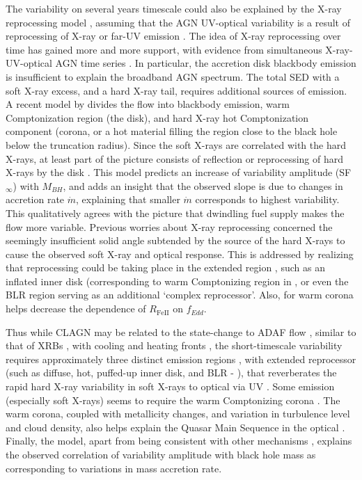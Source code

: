 \documentclass[twocolumn]{aastex62}
\begin{document}
The variability on several years timescale could also be explained by the X-ray reprocessing model \citep{kokubo2015, kubota2018}, assuming that the AGN UV-optical variability is a result of reprocessing of X-ray or far-UV emission \citep{krolik1991}.  The idea of X-ray reprocessing  over time has gained more and more support, with evidence from simultaneous X-ray-UV-optical AGN time series \citep{edelson2014, mchardy2018,  zhu2018}. In particular, the accretion disk blackbody emission is insufficient to explain the broadband AGN spectrum. The total SED with a soft X-ray excess, and a hard X-ray tail, requires additional sources of emission. A recent model by \citet{kubota2018} divides the flow into blackbody emission, warm Comptonization region (the disk), and hard X-ray hot Comptonization component (corona, or a hot material filling the region close to the black hole below the truncation radius).  Since the soft X-rays are correlated with the hard X-rays, at least part of the picture consists of reflection or reprocessing of hard X-rays by the disk \citep{lawrence2018}. This model predicts an increase of variability amplitude (SF$_{\infty}$) with $M_{BH}$, and adds an insight that the observed slope is due to changes in accretion rate $\dot{m}$, explaining that smaller $\dot{m}$ corresponds to highest variability. This qualitatively agrees with the picture that dwindling fuel supply makes the flow more variable. Previous worries about X-ray reprocessing concerned the seemingly insufficient solid angle subtended by the source of the hard X-rays to cause the observed soft X-ray and optical response. This is addressed by realizing that reprocessing could be taking place in the extended region \citep{gardner2017}, such as an inflated inner disk (corresponding to warm Comptonizing region in \citealt{kubota2018}, or even the BLR region serving as an additional `complex reprocessor'\citep{mchardy2018}. Also, for \citet{panda2019a} warm corona helps decrease the dependence of $R_{\mathrm{Fe  II}}$ on $f_{Edd}$. 

Thus while CLAGN may be related to the state-change to ADAF flow \citep{sniegowska2019}, similar to that of XRBs \citep{noda2018,ruan2019}, with cooling and heating fronts \citep{ross2018}, the short-timescale variability requires approximately three distinct emission regions \citep{kubota2018}, with extended reprocessor (such as diffuse, hot, puffed-up inner disk, and BLR - \citealt{mchardy2018}), that reverberates the rapid hard X-ray variability in soft X-rays to optical via UV \citep{fausnaugh2018}. Some emission (especially soft X-rays) seems to require the warm Comptonizing corona \citep{kubota2018}. The warm corona, coupled with metallicity changes, and variation in turbulence level and cloud density, also helps explain the Quasar Main Sequence in the optical \citep{panda2019a,panda2019b}. Finally, the \citet{kubota2018} model, apart from being consistent with other mechanisms \citep{mchardy2018, panda2019a, sniegowska2019, lawrence2018, ross2018, ruan2019}, explains the observed correlation of variability amplitude with black hole mass as corresponding to variations in mass accretion rate. 
\end{document}
